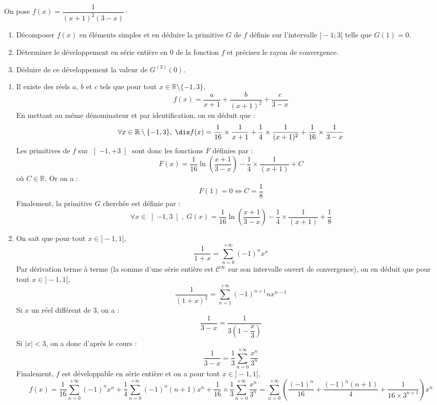 \documentclass[a4paper,10pt]{report}
\begin{document}
\begin{Exa} On pose $f(x)=\dfrac{1}{(x+1)^{2}(3-x)} \cdot$
\begin{enumerate}
\item Décomposer $f(x)$ en éléments simples et en déduire la primitive $G$ de $f$ définie sur l'intervalle $]-1;3[$ telle que $G(1)=0$.
\item Déterminer le développement en série entière en 0 de la fonction $f$ et précisez le rayon de convergence.
\item Déduire de ce développement la valeur de $G^{(3)}(0)$.
\end{enumerate}
\end{Exa}

\corr \begin{enumerate}
\item Il existe des réels $a$, $b$ et $c$ tels que pour tout $x \in \mathbb{R} \setminus \lbrace -1,3 \rbrace$,
$$ f(x) = \dfrac{a}{x+1} + \dfrac{b}{(x+1)^2} +  \dfrac{c}{3-x}$$
En mettant au même dénominateur et par identification, on en déduit que :
$$ \forall x \in \mathbb{R} \setminus \lbrace -1,3 \rbrace , \; \dis f(x)=\dfrac{1}{16}\times\dfrac{1}{x+1}+\dfrac{1}{4}\times\dfrac{1}{(x+1)^2}+\dfrac{1}{16}\times\dfrac{1}{3-x}$$
Les primitives de $f$ sur $\left]-1,+3\right[$ sont donc les fonctions $F$ définies par :
$$F(x)=\dfrac{1}{16}\ln \left( \dfrac{x+1}{3-x}\right) -\dfrac{1}{4}\times\dfrac{1}{(x+1)}+C$$
où $C\in\mathbb{R}$. Or on a :
$$F(1)=0\Longleftrightarrow C=\dfrac{1}{8}$$
Finalement, la primitive $G$ cherchée est définie par :
$$ \forall x\in \left]-1,3 \right[ , \; G(x)= \dfrac{1}{16}\ln \left( \dfrac{x+1}{3-x}\right) -\dfrac{1}{4}\times\dfrac{1}{(x+1)}+\dfrac{1}{8}$$
\item On sait que pour tout $x \in ]-1,1[$,
$$\dfrac{1}{1+x}=\sum\limits_{n=0}^{+\infty}(-1)^{n}x^n$$
Par dérivation terme à terme (la somme d'une série entière est $\mathcal{C}^{\infty}$ sur son intervalle ouvert de convergence), on en déduit que pour tout $x \in ]-1,1[$,
$$\dfrac{1}{(1+x)^2}=\sum\limits_{n=1}^{+\infty}(-1)^{n+1}nx^{n-1}$$
Si $x$ un réel différent de $3$, on a :
$$\dfrac{1}{3-x}=\dfrac{1} {3\left( 1-\dfrac{x}{3}\right) }$$
Si $\vert x \vert <3$, on a donc d'après le cours :
$$\dfrac{1}{3-x}=\dfrac{1}{3}\sum\limits_{n=0}^{+\infty}\dfrac{x^n}{3^n}$$
Finalement, $f$ est développable en série entière et on a pour tout $x \in ]-1,1[$,
$$ f(x) = \dfrac{1}{16} \sum\limits_{n=0}^{+\infty}(-1)^{n}x^n
+\dfrac{1}{4}\sum\limits_{n=0}^{+\infty}(-1)^{n}(n+1)x^{n}+\dfrac{1}{16}\times \dfrac{1}{3}\displaystyle\sum\limits_{n=0}^{+\infty}\dfrac{x^n}{3^n} = \displaystyle\sum\limits_{n=0}^{+\infty}\left(\dfrac{(-1)^n}{16}+\dfrac{(-1)^n(n+1)}{4}+\dfrac{1}{16\times3^{n+1}} \right) x^n$$

\end{enumerate}
\end{document}
